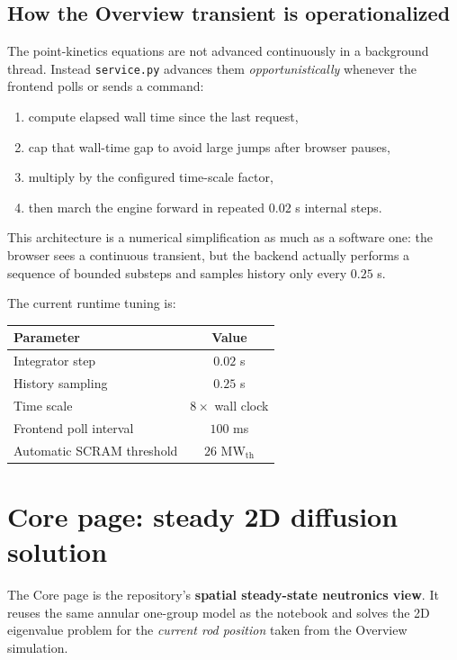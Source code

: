 \documentclass[11pt]{article}
\begin{document}
\subsection{How the Overview transient is operationalized}

The point-kinetics equations are not advanced continuously in a background
thread.  Instead \texttt{service.py} advances them \emph{opportunistically}
whenever the frontend polls or sends a command:
\begin{enumerate}
  \item compute elapsed wall time since the last request,
  \item cap that wall-time gap to avoid large jumps after browser pauses,
  \item multiply by the configured time-scale factor,
  \item then march the engine forward in repeated $0.02$ s internal steps.
\end{enumerate}

This architecture is a numerical simplification as much as a software one: the
browser sees a continuous transient, but the backend actually performs a sequence
of bounded substeps and samples history only every $0.25$ s.

The current runtime tuning is:
\begin{center}
\begin{tabular}{lc}
\toprule
Parameter & Value \\
\midrule
Integrator step & $0.02$ s \\
History sampling & $0.25$ s \\
Time scale & $8\times$ wall clock \\
Frontend poll interval & $100$ ms \\
Automatic SCRAM threshold & $26$ MW$_{\mathrm{th}}$ \\
\bottomrule
\end{tabular}
\end{center}

\section{Core page: steady 2D diffusion solution}

The Core page is the repository's \textbf{spatial steady-state neutronics view}.
It reuses the same annular one-group model as the notebook and solves the 2D
eigenvalue problem for the \emph{current rod position} taken from the Overview
simulation.
\end{document}
